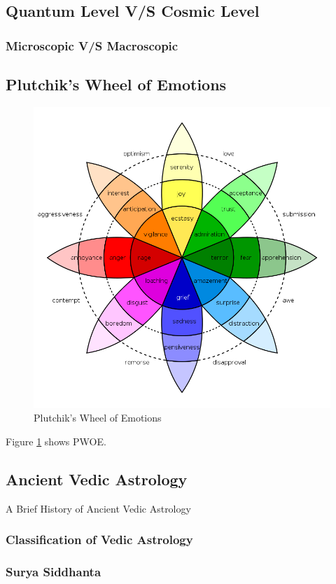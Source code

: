 \subsection{Quantum Level V/S Cosmic Level}
\subsubsection{Microscopic V/S Macroscopic}
\subsection{Plutchik's Wheel of Emotions}
\begin{figure}[H]
	\includegraphics[width=\columnwidth, keepaspectratio]{Plutchik'sWheelofEmotions.png}
	\caption{Plutchik's Wheel of Emotions}
	\label{Fig:fig1}
\end{figure}
Figure \ref{Fig:fig1} shows PWOE.
\subsection{Ancient Vedic Astrology}
A Brief History of Ancient Vedic Astrology
\subsubsection{Classification of Vedic Astrology}
\subsubsection{Surya Siddhanta}
